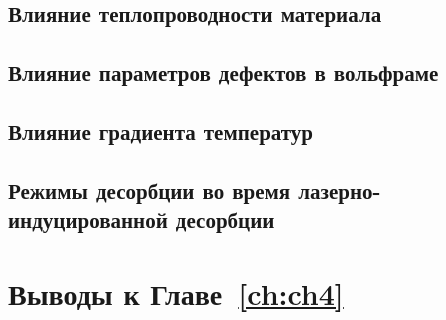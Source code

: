 \subsection{Влияние теплопроводности материала}\label{subsec:ch4/seс3/subsec2}
\subsection{Влияние параметров дефектов в вольфраме}\label{subsec:ch4/seс3/subsec3}
\subsection{Влияние градиента температур}\label{subsec:ch4/seс3/subsec4}
\subsection{Режимы десорбции во время лазерно-индуцированной десорбции}\label{sec:ch4/seс4/subsec5}

\section{Выводы к Главе~\ref{ch:ch4}}

\clearpage
